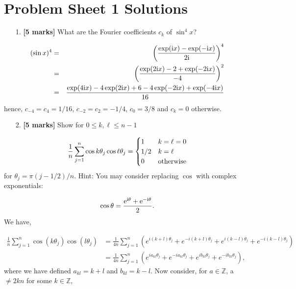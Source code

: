 \documentclass[12pt,a4paper]{article}
\begin{document}
\section{Problem Sheet 1 Solutions}
\begin{itemize}
\item[1. ] \textbf{[5 marks]} What are the Fourier coefficients $c_k$ of $\sin^4 x$?

\end{itemize}

\begin{eqnarray*}
(\sin x)^4 &=& \left({\exp({\rm i} x) - \exp(-{\rm i} x) \over 2 {\rm i}}\right)^4 \\
&=& \left({\exp(2{\rm i} x) -2 + \exp(-2{\rm i} x) \over -4}\right)^2 \\
&=& {\exp(4{\rm i} x) -4\exp(2{\rm i} x) +6 -4 \exp(-2{\rm i} x)+\exp(-4{\rm i} x) \over 16}
\end{eqnarray*}
hence, $c_{-4} = c_{4} = 1/16$, $c_{-2} = c_2 = -1/4$, $c_0 = 3/8$ and $c_k = 0$ otherwise.

\begin{itemize}
\item[2. ] \textbf{[5 marks]} Show for $0 \leq k,\ell \leq n-1$

\end{itemize}
\[
{1 \over n} \sum_{j=1}^n \cos k \theta_j \cos \ell \theta_j = \begin{cases} 1 & k = \ell = 0 \\
                                                  1/2 & k = \ell \\
                                                  0 & \hbox{otherwise}
                                                  \end{cases}
\]
for $\theta_j = \pi (j-1/2)/n$. Hint:     You may consider replacing $\cos$ with     complex exponentials:

\[
\cos \theta = {{\rm e}^{{\rm i}\theta} + {\rm e}^{-{\rm i}\theta} \over 2}.
\]
We have,


\begin{align*}
\frac{1}{n}\sum_{j=1}^n \cos(k\theta_j)\cos(l\theta_j) &= \frac{1}{4n}\sum_{j=1}^n\left( e^{i(k+l)\theta_j} + e^{-i(k+l)\theta_j} + e^{i(k-l)\theta_j} + e^{-i(k-l)\theta_j}\right) \\
&=	\frac{1}{4n}\sum_{j=1}^n \left( e^{ia_{kl}\theta_j} + e^{-ia_{kl}\theta_j} + e^{ib_{kl}\theta_j} + e^{-ib_{kl}\theta_j}\right),
\end{align*}
where we have defined $a_{kl} = k+l$ and $b_{kl} = k-l$. Now consider, for $a \in \mathbb{Z}$, a $\neq 2kn$ for some $k \in \mathbb{Z}$,
\end{document}
